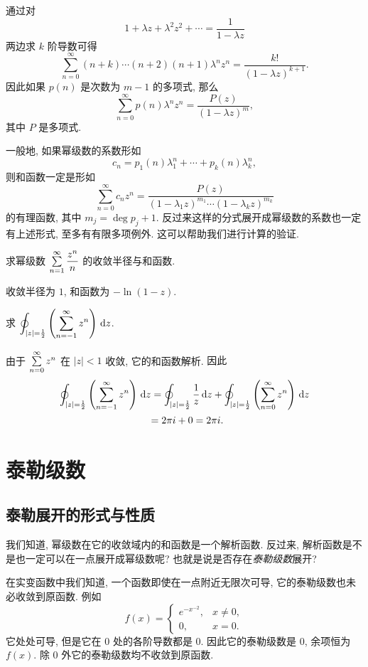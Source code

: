 \documentclass[nocolor,theme=doremi,lang=cn,11pt,chinese,twoside,openright,usesamecnt]{elegantbook}
\begin{document}
通过对
\[1+\lambda z+\lambda^2 z^2+\cdots=\dfrac1{1-\lambda z}\]
两边求 $k$ 阶导数可得
\[\sum_{n=0}^{\infty}(n+k)\cdots(n+2)(n+1)\lambda^n z^n=\frac{k!}{(1-\lambda z)^{k+1}}.\]
因此如果 $p(n)$ 是次数为 $m-1$ 的多项式, 那么
\[\sum_{n=0}^\infty p(n)\lambda^n z^n=\frac{P(z)}{(1-\lambda z)^{m}},\]
其中 $P$ 是多项式.

一般地, 如果幂级数的系数形如
\[c_n=p_1(n)\lambda_1^n+\cdots+p_k(n)\lambda_k^n,\]
则和函数一定是形如
\[\sum_{n=0}^{\infty}c_nz^n
=\frac{P(z)}{(1-\lambda_1z)^{m_1}\cdots(1-\lambda_kz)^{m_k}}\]
的有理函数,	其中 $m_j=\deg p_j+1$.
反过来这样的分式展开成幂级数的系数也一定有上述形式, 至多有有限多项例外.
这可以帮助我们进行计算的验证.
\begin{exercise}
	求幂级数 $\sum\limits_{n=1}^\infty\dfrac{z^n}n$ 的收敛半径与和函数.
\end{exercise}

\begin{answer}
	收敛半径为 $1$, 和函数为 $-\ln(1-z)$.
\end{answer}

\begin{example}
	求 $\displaystyle\oint_{|z|=\frac{1}{2} }\left(\sum_{n=-1}^\infty z^n\right)\,\mathrm{d} z$.
\end{example}

\begin{solution}
	由于 $\sum\limits_{n=0}^\infty z^n$ 在 $|z|<1$ 收敛,
{它的和函数解析.
}{因此
	\begin{align*}
	\oint_{|z|=\frac{1}{2} }\left(\sum_{n=-1}^\infty z^n\right)\,\mathrm{d} z
	&=\oint_{|z|=\frac{1}{2} }\frac1z\,\mathrm{d} z+\oint_{|z|=\frac{1}{2} }\left(\sum_{n=0}^\infty z^n\right)\,\mathrm{d} z\\
	&{=2\pi i+0=2\pi i.}
\end{align*}}
\end{solution}

\section{泰勒级数}

\subsection{泰勒展开的形式与性质}

我们知道, 幂级数在它的收敛域内的和函数是一个解析函数.
反过来, 解析函数是不是也一定可以在一点展开成幂级数呢? 也就是说是否存在\emph{泰勒级数}展开?

在实变函数中我们知道, 一个函数即使在一点附近无限次可导, 它的泰勒级数也未必收敛到原函数.
例如
\[f(x)=\begin{cases}
e^{-x^{-2}},&x\neq 0,\\
0,&x=0.\end{cases}\]
它处处可导, 但是它在 $0$ 处的各阶导数都是 $0$.
因此它的泰勒级数是 $0$, 余项恒为 $f(x)$.
除 $0$ 外它的泰勒级数均不收敛到原函数.
\end{document}
